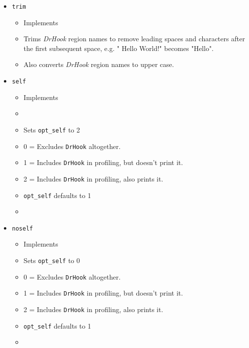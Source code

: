 \begin{itemize}
\begin{itemize}
    \end{itemize}
    \item\verb+trim+
    \begin{itemize}
        \item[] Implements
        \item Trims \textit{DrHook} region names to remove leading spaces and characters after the first subsequent space, e.g. "  Hello World!" becomes "Hello".
        \item Also converts \textit{DrHook} region names to upper case.
    \end{itemize}
    \item\verb+self+
    \begin{itemize}
        \item[] Implements
        \item {}
        \item Sets \texttt{opt\_self} to 2
        \item 0 = Excludes \texttt{DrHook} altogether.
        \item 1 = Includes \texttt{DrHook} in profiling, but doesn't print it.
        \item 2 = Includes \texttt{DrHook} in profiling, also prints it.
        \item \texttt{opt\_self} defaults to 1
        \item {}
    \end{itemize}
    \item\verb+noself+
    \begin{itemize}
        \item[] Implements
        \item Sets \texttt{opt\_self} to 0
        \item 0 = Excludes \texttt{DrHook} altogether.
        \item 1 = Includes \texttt{DrHook} in profiling, but doesn't print it.
        \item 2 = Includes \texttt{DrHook} in profiling, also prints it.
        \item \texttt{opt\_self} defaults to 1
        \item {}
    \end{itemize}

\end{itemize}
